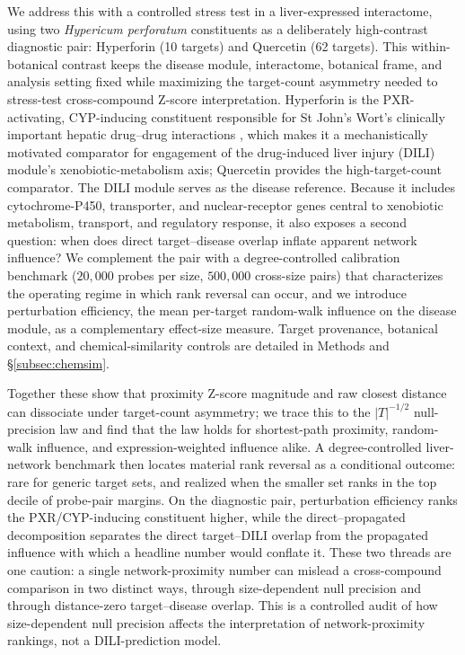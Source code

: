 We address this with a controlled stress test in a liver-expressed interactome, using two \textit{Hypericum perforatum} constituents as a deliberately high-contrast diagnostic pair: Hyperforin (10 targets) and Quercetin (62 targets). This within-botanical contrast keeps the disease module, interactome, botanical frame, and analysis setting fixed while maximizing the target-count asymmetry needed to stress-test cross-compound Z-score interpretation. Hyperforin is the PXR-activating, CYP-inducing constituent responsible for St John's Wort's clinically important hepatic drug--drug interactions \citep{Moore2000, Watkins2001, Chen2022}, which makes it a mechanistically motivated comparator for engagement of the drug-induced liver injury (DILI) module's xenobiotic-metabolism axis; Quercetin provides the high-target-count comparator. The DILI module serves as the disease reference. Because it includes cytochrome-P450, transporter, and nuclear-receptor genes central to xenobiotic metabolism, transport, and regulatory response, it also exposes a second question: when does direct target--disease overlap inflate apparent network influence? We complement the pair with a degree-controlled calibration benchmark ($20{,}000$ probes per size, $500{,}000$ cross-size pairs) that characterizes the operating regime in which rank reversal can occur, and we introduce perturbation efficiency, the mean per-target random-walk influence on the disease module, as a complementary effect-size measure. Target provenance, botanical context, and chemical-similarity controls are detailed in Methods and \S\ref{subsec:chemsim}.

Together these show that proximity Z-score magnitude and raw closest distance can dissociate under target-count asymmetry; we trace this to the $|T|^{-1/2}$ null-precision law and find that the law holds for shortest-path proximity, random-walk influence, and expression-weighted influence alike. A degree-controlled liver-network benchmark then locates material rank reversal as a conditional outcome: rare for generic target sets, and realized when the smaller set ranks in the top decile of probe-pair margins. On the diagnostic pair, perturbation efficiency ranks the PXR/CYP-inducing constituent higher, while the direct--propagated decomposition separates the direct target--DILI overlap from the propagated influence with which a headline number would conflate it. These two threads are one caution: a single network-proximity number can mislead a cross-compound comparison in two distinct ways, through size-dependent null precision and through distance-zero target--disease overlap. This is a controlled audit of how size-dependent null precision affects the interpretation of network-proximity rankings, not a DILI-prediction model.
